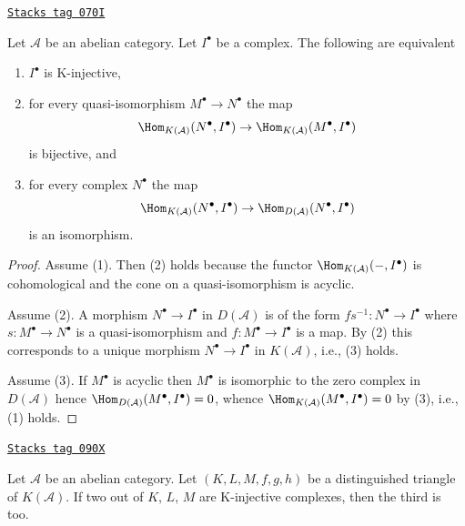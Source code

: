 \begin{lemma}[K injective]
\label{derived-lemma-K-injective}
\href{https://stacks.math.columbia.edu/tag/070I}{\texttt{Stacks tag 070I}}

Let $\mathcal{A}$ be an abelian category.
Let $I^\bullet$ be a complex. The following are equivalent
\begin{enumerate}
\item $I^\bullet$ is K-injective,
\item for every quasi-isomorphism $M^\bullet \to N^\bullet$ the map
$$
\Hom_{K(\mathcal{A})}(N^\bullet, I^\bullet)
\to \Hom_{K(\mathcal{A})}(M^\bullet, I^\bullet)
$$
is bijective, and
\item for every complex $N^\bullet$ the map
$$
\Hom_{K(\mathcal{A})}(N^\bullet, I^\bullet)
\to \Hom_{D(\mathcal{A})}(N^\bullet, I^\bullet)
$$
is an isomorphism.
\end{enumerate}
\end{lemma}

\begin{proof}
Assume (1). Then (2) holds because the functor
$\Hom_{K(\mathcal{A})}( - , I^\bullet)$ is cohomological
and the cone on a quasi-isomorphism is acyclic.

\medskip\noindent
Assume (2). A morphism $N^\bullet \to I^\bullet$ in $D(\mathcal{A})$
is of the form $fs^{-1} : N^\bullet \to I^\bullet$ where
$s : M^\bullet \to N^\bullet$ is a quasi-isomorphism and
$f : M^\bullet \to I^\bullet$ is a map. By (2) this corresponds to
a unique morphism $N^\bullet \to I^\bullet$ in $K(\mathcal{A})$, i.e.,
(3) holds.

\medskip\noindent
Assume (3). If $M^\bullet$ is acyclic then $M^\bullet$ is isomorphic
to the zero complex in $D(\mathcal{A})$ hence
$\Hom_{D(\mathcal{A})}(M^\bullet, I^\bullet) = 0$, whence
$\Hom_{K(\mathcal{A})}(M^\bullet, I^\bullet) = 0$ by (3),
i.e., (1) holds.
\end{proof}

\begin{lemma}
\label{derived-lemma-triangle-K-injective}
\href{https://stacks.math.columbia.edu/tag/090X}{\texttt{Stacks tag 090X}}

Let $\mathcal{A}$ be an abelian category. Let $(K, L, M, f, g, h)$
be a distinguished triangle of $K(\mathcal{A})$. If two out of
$K$, $L$, $M$ are K-injective complexes, then the third is too.
\end{lemma}

